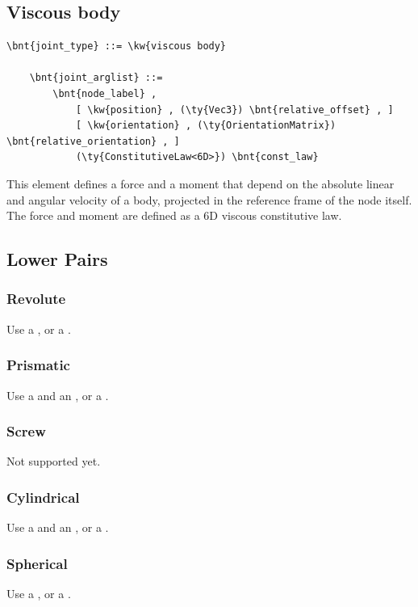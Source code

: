 \subsection{Viscous body}
\label{sec:EL:STRUCT:JOINT:VISCOUS_BODY}
\begin{Verbatim}[commandchars=\\\{\}]
    \bnt{joint_type} ::= \kw{viscous body}

    \bnt{joint_arglist} ::=
        \bnt{node_label} ,
            [ \kw{position} , (\ty{Vec3}) \bnt{relative_offset} , ]
            [ \kw{orientation} , (\ty{OrientationMatrix}) \bnt{relative_orientation} , ]
            (\ty{ConstitutiveLaw<6D>}) \bnt{const_law}
\end{Verbatim}
This element defines a force and a moment that depend on the absolute 
linear and angular velocity of a body, projected in the reference frame
of the node itself.
The force and moment are defined as a 6D viscous constitutive law.


\subsection{Lower Pairs}

\subsubsection{Revolute}
Use a , or a .

\subsubsection{Prismatic}
Use a  and an , or a .

\subsubsection{Screw}
Not supported yet.

\subsubsection{Cylindrical}
Use a  and an , or a .

\subsubsection{Spherical}
Use a , or a .

